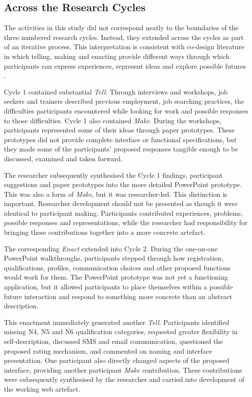 \subsection{\texorpdfstring{\tme}{Tell-Make-Enact} Across the Research Cycles}

The \tme{} activities in this study did not correspond neatly to the boundaries of the three numbered research cycles. Instead, they extended across the cycles as part of an iterative process. This interpretation is consistent with co-design literature in which telling, making and enacting provide different ways through which participants can express experiences, represent ideas and explore possible futures \cite{sanders2008,sanders2014}.

Cycle 1 contained substantial \textit{Tell}. Through interviews and workshops, job seekers and trainers described previous employment, job searching practices, the difficulties participants encountered while looking for work and possible responses to those difficulties. Cycle 1 also contained \textit{Make}. During the workshops, participants represented some of their ideas through paper prototypes. These prototypes did not provide complete interface or functional specifications, but they made some of the participants' proposed responses tangible enough to be discussed, examined and taken forward.

The researcher subsequently synthesised the Cycle 1 findings, participant suggestions and paper prototypes into the more detailed PowerPoint prototype. This was also a form of \textit{Make}, but it was researcher-led. This distinction is important. Researcher development should not be presented as though it were identical to participant making. Participants contributed experiences, problems, possible responses and representations, while the researcher had responsibility for bringing these contributions together into a more concrete artefact.

The corresponding \textit{Enact} extended into Cycle 2. During the one-on-one PowerPoint walkthroughs, participants stepped through how registration, qualifications, profiles, communication choices and other proposed functions would work for them. The PowerPoint prototype was not yet a functioning application, but it allowed participants to place themselves within a possible future interaction and respond to something more concrete than an abstract description.

This enactment immediately generated another \textit{Tell}. Participants identified missing N4, N5 and N6 qualification categories, requested greater flexibility in self-description, discussed SMS and email communication, questioned the proposed rating mechanism, and commented on naming and interface presentation. One participant also directly changed aspects of the proposed interface, providing another participant \textit{Make} contribution. These contributions were subsequently synthesised by the researcher and carried into development of the working web artefact.

